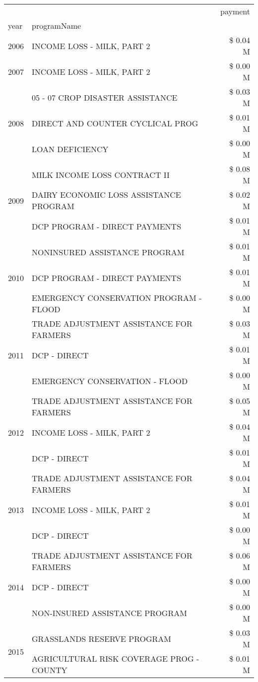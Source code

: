 \begin{tabular}{llr}
\toprule
 &  & payment \\
year & programName &  \\
\midrule
2006 & INCOME LOSS - MILK, PART 2 & \$ 0.04 M \\
\cline{1-3}
2007 & INCOME LOSS - MILK, PART 2 & \$ 0.00 M \\
\cline{1-3}
\multirow[t]{3}{*}{2008} & 05 - 07 CROP DISASTER ASSISTANCE & \$ 0.03 M \\
 & DIRECT AND COUNTER CYCLICAL PROG & \$ 0.01 M \\
 & LOAN DEFICIENCY & \$ 0.00 M \\
\cline{1-3}
\multirow[t]{3}{*}{2009} & MILK INCOME LOSS CONTRACT II & \$ 0.08 M \\
 & DAIRY ECONOMIC LOSS ASSISTANCE PROGRAM & \$ 0.02 M \\
 & DCP PROGRAM - DIRECT PAYMENTS & \$ 0.01 M \\
\cline{1-3}
\multirow[t]{3}{*}{2010} & NONINSURED ASSISTANCE PROGRAM & \$ 0.01 M \\
 & DCP PROGRAM - DIRECT PAYMENTS & \$ 0.01 M \\
 & EMERGENCY CONSERVATION PROGRAM - FLOOD & \$ 0.00 M \\
\cline{1-3}
\multirow[t]{3}{*}{2011} & TRADE ADJUSTMENT ASSISTANCE FOR FARMERS & \$ 0.03 M \\
 & DCP - DIRECT & \$ 0.01 M \\
 & EMERGENCY CONSERVATION - FLOOD & \$ 0.00 M \\
\cline{1-3}
\multirow[t]{3}{*}{2012} & TRADE ADJUSTMENT ASSISTANCE FOR FARMERS & \$ 0.05 M \\
 & INCOME LOSS - MILK, PART 2 & \$ 0.04 M \\
 & DCP - DIRECT & \$ 0.01 M \\
\cline{1-3}
\multirow[t]{3}{*}{2013} & TRADE ADJUSTMENT ASSISTANCE FOR FARMERS & \$ 0.04 M \\
 & INCOME LOSS - MILK, PART 2 & \$ 0.01 M \\
 & DCP - DIRECT & \$ 0.00 M \\
\cline{1-3}
\multirow[t]{3}{*}{2014} & TRADE ADJUSTMENT ASSISTANCE FOR FARMERS & \$ 0.06 M \\
 & DCP - DIRECT & \$ 0.00 M \\
 & NON-INSURED ASSISTANCE PROGRAM & \$ 0.00 M \\
\cline{1-3}
\multirow[t]{3}{*}{2015} & GRASSLANDS RESERVE PROGRAM & \$ 0.03 M \\
 & AGRICULTURAL RISK COVERAGE PROG - COUNTY & \$ 0.01 M \\

\end{tabular}
